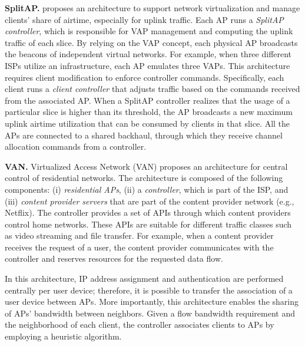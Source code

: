 

\textbf{SplitAP.}
\cite{SplitAP} proposes an architecture to support network virtualization and manage clients' share of airtime, especially for uplink traffic.
Each AP runs a \textit{SplitAP controller}, which is responsible for VAP management and computing the uplink traffic of each slice.
By relying on the VAP concept, each physical AP broadcasts the beacons of independent virtual networks.
For example, when three different ISPs utilize an infrastructure, each AP emulates three VAPs.
This architecture requires client modification to enforce controller commands.
Specifically, each client runs a \textit{client controller} that adjusts traffic based on the commands received from the associated AP.
When a SplitAP controller realizes that the usage of a particular slice is higher than its threshold, the AP broadcasts a new maximum uplink airtime utilization that can be consumed by clients in that slice.
All the APs are connected to a shared backhaul, through which they receive channel allocation commands from a controller.




\textbf{VAN.}
\label{VAN_arch}
Virtualized Access Network (VAN) \cite{VAN} proposes an architecture for central control of residential networks.
The architecture is composed of the following components: (i) \textit{residential APs}, (ii) a \textit{controller}, which is part of the ISP, and (iii) \textit{content provider servers} that are part of the content provider network (e.g., Netflix).
The controller provides a set of APIs through which content providers control home networks.
These APIs are suitable for different traffic classes such as video streaming and file transfer.
For example, when a content provider receives the request of a user, the content provider communicates with the controller and reserves resources for the requested data flow.

In this architecture, IP address assignment and authentication are performed centrally per user device; therefore, it is possible to transfer the association of a user device between APs.
More importantly, this architecture enables the sharing of APs' bandwidth between neighbors.
Given a flow bandwidth requirement and the neighborhood of each client, the controller associates clients to APs by employing a heuristic algorithm.



